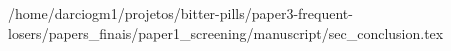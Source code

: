 /home/darciogm1/projetos/bitter-pills/paper3-frequent-losers/papers_finais/paper1_screening/manuscript/sec_conclusion.tex